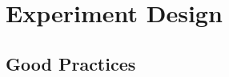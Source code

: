 \documentclass{beamer}
\begin{document}
\section{Experiment Design}









\subsection{Good Practices}
\end{document}
